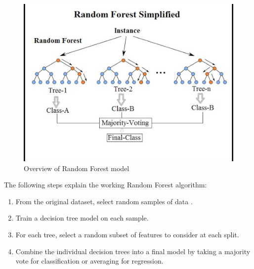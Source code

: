 \documentclass{ieeeojies}
\begin{document}
\begin{figure}[H]
	\centering
	\begin{minipage}{0.23\textwidth}
		\centering
		\includegraphics[width=1\textwidth]{bibliography/Images/RandomForest_Img2.png}
		\caption{Overview of Random Forest model}
		\label{fig:1}
	\end{minipage}
\end{figure}
The following steps explain the working Random Forest algorithm:
\begin{enumerate}
	\item From the original dataset, select random samples of data .
	\item Train a decision tree model on each sample.
	\item For each tree, select a random subset of features to consider at each split.
	\item Combine the individual decision trees into a final model by taking a majority vote for classification or averaging for regression.
\end{enumerate}
\end{document}

